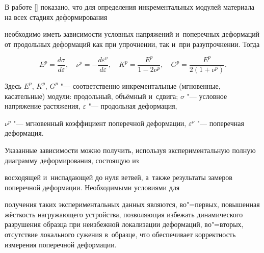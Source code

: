 


\maketitle



В работе [] показано, что для определения инкрементальных модулей материала на всех стадиях деформирования

необходимо иметь зависимости условных напряжений и~поперечных деформаций от продольных деформаций как при упрочнении, так и~при разупрочнении. Тогда

\begin{equation}\label{mystruzu:eq1}

E^{p}=\frac{d \sigma}{d \varepsilon},\quad  \nu^{p}=-\frac{d

\varepsilon^{\nu}}{d \varepsilon},\quad 

K^{p}=\frac{E^{p}}{1-2\nu^{p}},\quad 

G^{p}=\frac{E^{p}}{2(1+\nu^{p})}.

\end{equation}

Здесь $E^{p}$, $K^{p}$, $G^{p}$ "--- соответственно инкрементальные (мгновенные, касательные) модули: продольный, объёмный и~сдвига; $\sigma$ "--- условное напряжение растяжения, $\varepsilon$ "--- продольная деформация, 

$\nu^{p}$ "--- мгновенный коэффициент поперечной деформации, $\varepsilon^{\nu}$ "--- поперечная деформация. 

Указанные зависимости можно получить, используя экспериментальную полную диаграмму деформирования, состоящую из

восходящей и~ниспадающей до нуля ветвей, а~также результаты замеров поперечной деформации. Необходимыми условиями для

получения таких экспериментальных данных являются, во"=первых, повышенная жёсткость нагружающего устройства, позволяющая избежать динамического разрушения образца при неизбежной локализации деформаций, во"=вторых, отсутствие локального сужения в~образце, что обеспечивает корректность измерения поперечной деформации.





